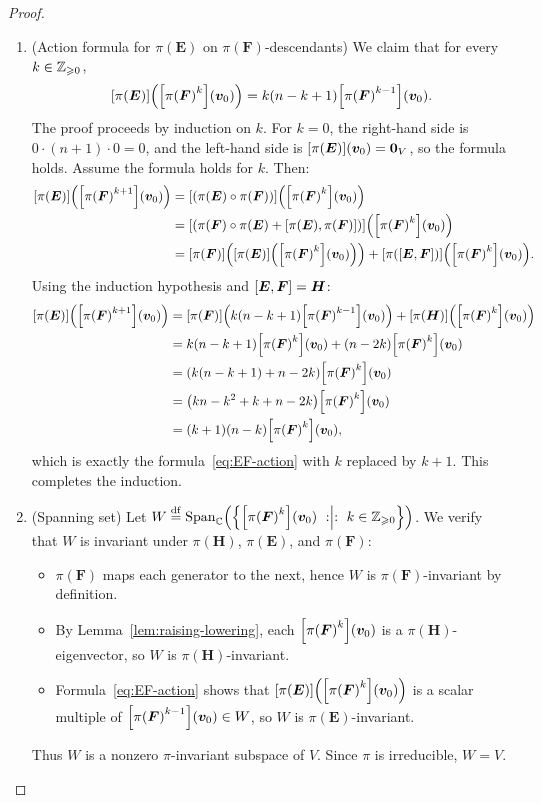 \documentclass[11pt,reqno]{amsart}
\begin{document}
\begin{proof}
\begin{enumerate}
\item (Action formula for $\pi(\bm E)$ on $\pi(\bm F)$-descendants)
We claim that for every $k\in\mathbb{Z}_{\geqslant 0}$,
\begin{equation}\label{eq:EF-action}
\FUNC{\pi(\bm E)}{\FUNC{\pi\Br{\bm F}^k}{\bm{v}_0}}
=k(n-k+1)\FUNC{\pi\Br{\bm F}^{k-1}}{\bm{v}_0}.
\end{equation}
The proof proceeds by induction on $k$.
For $k=0$, the right-hand side is $0\cdot(n+1)\cdot0=0$, and
the left-hand side is $\FUNC{\pi(\bm E)}{\bm{v}_0}=\bm0_V$, so the formula holds.
Assume the formula holds for $k$.  Then:
\[
\begin{aligned}
\FUNC{\pi(\bm E)}{\FUNC{\pi\Br{\bm F}^{k+1}}{\bm{v}_0}}
&=\FUNC{(\pi(\bm E)\circ\pi(\bm F))}{\FUNC{\pi\Br{\bm F}^k}{\bm{v}_0}} \\
&=\FUNC{(\pi(\bm F)\circ\pi(\bm E)+\SqBr{\pi(\bm E),\pi(\bm F)})}
{\FUNC{\pi\Br{\bm F}^k}{\bm{v}_0}} \\
&=\FUNC{\pi(\bm F)}{\FUNC{\pi(\bm E)}{\FUNC{\pi\Br{\bm F}^k}{\bm{v}_0}}}
+\FUNC{\pi\Br{\SqBr{\bm E,\bm F}}}{\FUNC{\pi\Br{\bm F}^k}{\bm{v}_0}}.
\end{aligned}
\]
Using the induction hypothesis and $\SqBr{\bm E,\bm F}=\bm H$:
\[
\begin{aligned}
\FUNC{\pi(\bm E)}{\FUNC{\pi\Br{\bm F}^{k+1}}{\bm{v}_0}}
&=\FUNC{\pi(\bm F)}
{k(n-k+1)\FUNC{\pi\Br{\bm F}^{k-1}}{\bm{v}_0}}
+\FUNC{\pi(\bm H)}{\FUNC{\pi\Br{\bm F}^k}{\bm{v}_0}} \\
&=k(n-k+1)\FUNC{\pi\Br{\bm F}^k}{\bm{v}_0}
+(n-2k)\FUNC{\pi\Br{\bm F}^k}{\bm{v}_0} \\
&=\Br{k(n-k+1)+n-2k}\FUNC{\pi\Br{\bm F}^k}{\bm{v}_0} \\
&=\Br{kn-k^2+k+n-2k}\FUNC{\pi\Br{\bm F}^k}{\bm{v}_0} \\
&=(k+1)(n-k)\FUNC{\pi\Br{\bm F}^k}{\bm{v}_0},
\end{aligned}
\]
which is exactly the formula~\eqref{eq:EF-action} with $k$ replaced by $k+1$.
This completes the induction.

\item (Spanning set)
Let $W\df\operatorname{Span}_\C\Br{\set{\FUNC{\pi\Br{\bm F}^k}{\bm{v}_0}\st k\in\Z_{\ge 0}}}$.
We verify that $W$ is invariant under $\pi(\bm H)$, $\pi(\bm E)$, and
$\pi(\bm F)$:
\begin{itemize}
\item $\pi(\bm F)$ maps each generator to the next, hence $W$ is
$\pi(\bm F)$-invariant by definition.
\item By Lemma~\ref{lem:raising-lowering}, each $\FUNC{\pi\Br{\bm F}^k}{\bm{v}_0}$ is a
$\pi(\bm H)$-eigenvector, so $W$ is $\pi(\bm H)$-invariant.
\item Formula~\eqref{eq:EF-action} shows that
$\FUNC{\pi(\bm E)}{\FUNC{\pi\Br{\bm F}^k}{\bm{v}_0}}$ is a scalar multiple of
$\FUNC{\pi\Br{\bm F}^{k-1}}{\bm{v}_0}\in W$, so $W$ is $\pi(\bm E)$-invariant.
\end{itemize}
Thus $W$ is a nonzero $\pi$-invariant subspace of $V$.
Since $\pi$ is irreducible, $W=V$.



\end{enumerate}
\end{proof}
\end{document}

